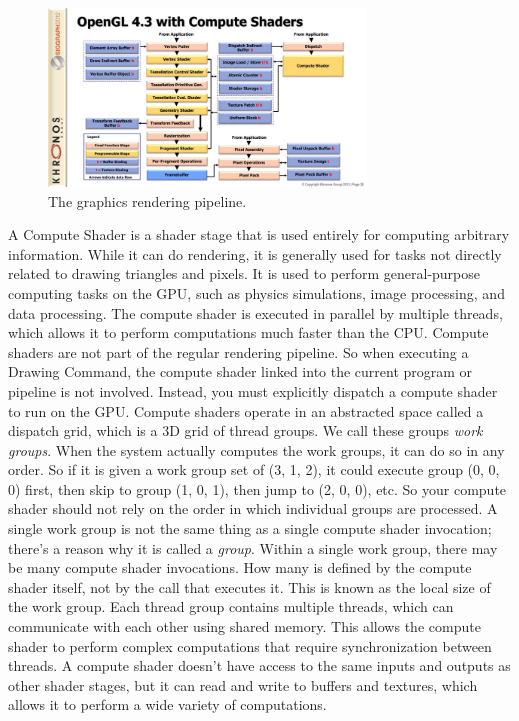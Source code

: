 \documentclass{report}
\begin{document}
\begin{figure}[h!]
  \centering
  \includegraphics[width=0.75\textwidth]{img/compute_shaders.jpg}
  \caption{The graphics rendering pipeline.}
  \label{fig:pipeline}
\end{figure}

A Compute Shader is a shader stage that is used entirely for computing arbitrary information. While it can do rendering, it is generally used for tasks not directly related to drawing triangles and pixels.
It is used to perform general-purpose computing tasks on the GPU, such as physics simulations, image processing, and data processing.
The compute shader is executed in parallel by multiple threads, which allows it to perform computations much faster than the CPU.
Compute shaders are not part of the regular rendering pipeline. So when executing a Drawing Command, the compute shader linked into the current program or pipeline is not involved. Instead, you must explicitly dispatch a compute shader to run on the GPU.
Compute shaders operate in an abstracted space called a dispatch grid, which is a 3D grid of thread groups. We call these groups \textit{work groups}.
When the system actually computes the work groups, it can do so in any order. So if it is given a work group set of (3, 1, 2), it could execute group (0, 0, 0) first, then skip to group (1, 0, 1), then jump to (2, 0, 0), etc. So your compute shader should not rely on the order in which individual groups are processed.
A single work group is not the same thing as a single compute shader invocation; there's a reason why it is called a \textit{group}. Within a single work group, there may be many compute shader invocations. How many is defined by the compute shader itself, not by the call that executes it. This is known as the local size of the work group. 
Each thread group contains multiple threads, which can communicate with each other using shared memory. This allows the compute shader to perform complex computations that require synchronization between threads.
A compute shader doesn't have access to the same inputs and outputs as other shader stages, but it can read and write to buffers and textures, which allows it to perform a wide variety of computations.
\end{document}
